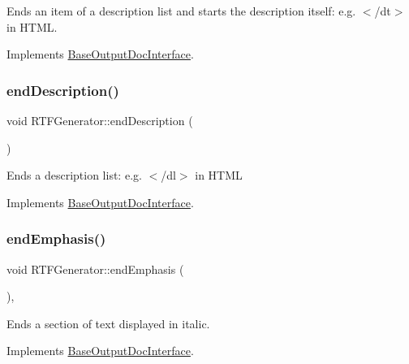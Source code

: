 Ends an item of a description list and starts the description itself\+: e.\+g. {\ttfamily $<$/dt$>$} in H\+T\+ML. 

Implements \mbox{\hyperlink{class_base_output_doc_interface_a09e3aa9d3faac55b2cc9290eaa69f55b}{Base\+Output\+Doc\+Interface}}.

\mbox{\label{class_r_t_f_generator_a4c9b42e803206c575f464d82eec460d9}} 
\subsubsection{\texorpdfstring{endDescription()}{endDescription()}}
{\footnotesize\ttfamily void R\+T\+F\+Generator\+::end\+Description (\begin{DoxyParamCaption}{ }\end{DoxyParamCaption})\hspace{0.3cm}{\ttfamily [virtual]}}

Ends a description list\+: e.\+g. {\ttfamily $<$/dl$>$} in H\+T\+ML 

Implements \mbox{\hyperlink{class_base_output_doc_interface_ac25c565e9fd8aee6c2b0d9b71fcff380}{Base\+Output\+Doc\+Interface}}.

\mbox{\label{class_r_t_f_generator_a283896a8d13cd017f4b765d82ba1e132}} 
\subsubsection{\texorpdfstring{endEmphasis()}{endEmphasis()}}
{\footnotesize\ttfamily void R\+T\+F\+Generator\+::end\+Emphasis (\begin{DoxyParamCaption}{ }\end{DoxyParamCaption})\hspace{0.3cm}{\ttfamily [inline]}, {\ttfamily [virtual]}}

Ends a section of text displayed in italic. 

Implements \mbox{\hyperlink{class_base_output_doc_interface_aed2cf04d82648509f97403bd4ce62590}{Base\+Output\+Doc\+Interface}}.

\mbox{\label{class_r_t_f_generator_a8753e9a10c126e0f8b9af7ff9783afcd}} 
